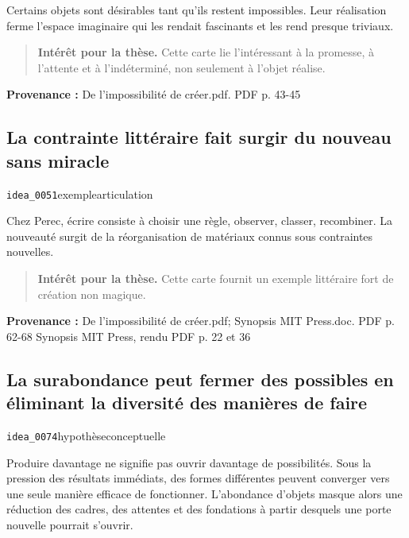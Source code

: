 \documentclass[10pt,a4paper]{article}
\begin{document}
Certains objets sont désirables tant qu'ils restent impossibles. Leur réalisation ferme l'espace imaginaire qui les rendait fascinants et les rend presque triviaux.

\begin{quote}
\textbf{Intérêt pour la thèse.} Cette carte lie l'intéressant à la promesse, à l'attente et à l'indéterminé, non seulement à l'objet réalise.
\end{quote}
{\footnotesize\color{metadata}\textbf{Provenance :} De l'impossibilité de créer.pdf. PDF p. 43-45\par}

\subsection{La contrainte littéraire fait surgir du nouveau sans miracle}
{\small\color{metadata} \texttt{idea\_0051}\quad\textbullet\quad exemple\quad\textbullet\quad articulation\par}

Chez Perec, écrire consiste à choisir une règle, observer, classer, recombiner. La nouveauté surgit de la réorganisation de matériaux connus sous contraintes nouvelles.

\begin{quote}
\textbf{Intérêt pour la thèse.} Cette carte fournit un exemple littéraire fort de création non magique.
\end{quote}
{\footnotesize\color{metadata}\textbf{Provenance :} De l'impossibilité de créer.pdf; Synopsis MIT Press.doc. PDF p. 62-68 Synopsis MIT Press, rendu PDF p. 22 et 36\par}

\subsection{La surabondance peut fermer des possibles en éliminant la diversité des manières de faire}
{\small\color{metadata} \texttt{idea\_0074}\quad\textbullet\quad hypothèse\quad\textbullet\quad conceptuelle\par}

Produire davantage ne signifie pas ouvrir davantage de possibilités. Sous la pression des résultats immédiats, des formes différentes peuvent converger vers une seule manière efficace de fonctionner. L'abondance d'objets masque alors une réduction des cadres, des attentes et des fondations à partir desquels une porte nouvelle pourrait s'ouvrir.
\end{document}
